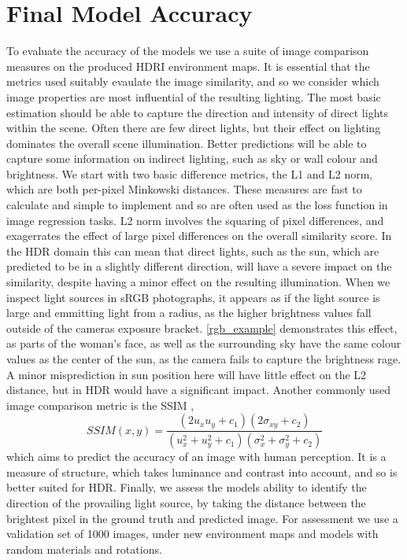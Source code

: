 \documentclass[ %
                    author={Gavin Parker},
                supervisor={Dr. Neill Campbell},
                    degree={MEng},
                     title={Deep Siamese Networks for Illumination Estimation from Stereo Images},
                  subtitle={},
                      type={research},
                      year={2018} ]{dissertation}
\begin{document}
\section{Final Model Accuracy}
To evaluate the accuracy of the models we use a suite of image comparison measures on the produced HDRI environment maps. It is essential that the metrics used suitably evaulate the image similarity, and so we consider which image properties are most influential of the resulting lighting. The most basic estimation should be able to capture the direction and intensity of direct lights within the scene. Often there are few direct lights, but their effect on lighting dominates the overall scene illumination. Better predictions will be able to capture some information on indirect lighting, such as sky or wall colour and brightness.
\newline 
We start with two basic difference metrics, the L1 and L2 norm, which are both per-pixel Minkowski distances. These measures are fast to calculate and simple to implement and so are often used as the loss function in image regression tasks. L2 norm involves the squaring of pixel differences, and exagerrates the effect of large pixel differences on the overall similarity score. In the HDR domain this can mean that direct lights, such as the sun, which are predicted to be in a slightly different direction, will have a severe impact on the similarity, despite having a minor effect on the resulting illumination. When we inspect light sources in sRGB photographs, it appears as if the light source is large and emmitting light from a radius, as the higher brightness values fall outside of the cameras exposure bracket. \ref{rgb_example} demonstrates this effect, as parts of the woman's face, as well as the surrounding sky have the same colour values as the center of the sun, as the camera fails to capture the brightness rage. A minor misprediction in sun position here will have little effect on the L2 distance, but in HDR would have a significant impact.
\newline
Another commonly used image comparison metric is the SSIM \cite{1284395},
\[SSIM(x,y) = \frac{(2u_xu_y + c_1)(2\sigma_{xy} + c_2)}{(u^2_x + u^2_y + c_1)(\sigma^2_x + \sigma^2_y + c_2)}\]
which aims to predict the accuracy of an image with human perception. It is a measure of structure, which takes luminance and contrast into account, and so is better suited for HDR. Finally, we assess the models ability to identify the direction of the provailing light source, by taking the distance between the brightest pixel in the ground truth and predicted image. For assessment we use a validation set of 1000 images, under new environment maps and models with random materials and rotations.
\end{document}
